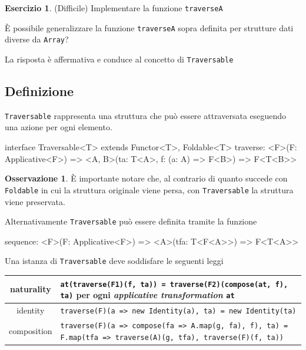 \documentclass[12pt]{article}
\theoremstyle{definition}
\newtheorem{exercise}{Esercizio}[section]
\newtheorem{observation}{Osservazione}[section]
\newenvironment{code}
  {\vspace{0.5cm} \VerbatimEnvironment\begin{typescriptcode}}
  {\end{typescriptcode} \vspace{0.2cm}}
\begin{document}
\begin{exercise}
(Difficile) Implementare la funzione \texttt{traverseA}
\end{exercise}

È possibile generalizzare la funzione \texttt{traverseA} sopra definita per strutture dati diverse da \texttt{Array}?

La risposta è affermativa e conduce al concetto di \texttt{Traversable}

\subsection{Definizione}

\texttt{Traversable} rappresenta una struttura che può essere attraversata eseguendo una azione per ogni elemento.

\begin{code}
interface Traversable<T> extends Functor<T>, Foldable<T> {
  traverse: <F>(F: Applicative<F>) =>
    <A, B>(ta: T<A>, f: (a: A) => F<B>) => F<T<B>>
}
\end{code}

\begin{observation}
È importante notare che, al contrario di quanto succede con \texttt{Foldable} in cui la struttura originale viene persa,
con \texttt{Traversable} la struttura viene preservata.
\end{observation}

Alternativamente \texttt{Traversable} può essere definita tramite la funzione

\begin{code}
sequence: <F>(F: Applicative<F>) => <A>(tfa: T<F<A>>) => F<T<A>>
\end{code}

Una istanza di \texttt{Traversable} deve soddisfare le seguenti leggi

\begin{center}
\bgroup
\def\arraystretch{1.5}
\begin{tabular}{ |c|p{10cm}| }
\hline
naturality & \texttt{at(traverse(F1)(f, ta)) = traverse(F2)(compose(at, f), ta)} per ogni \emph{applicative transformation} \texttt{at} \\
\hline
identity & \texttt{traverse(F)(a => new Identity(a), ta) = new Identity(ta)} \\
\hline
composition & \texttt{traverse(F)(a => compose(fa => A.map(g, fa), f), ta) = F.map(tfa => traverse(A)(g, tfa), traverse(F)(f, ta))} \\
\hline
\end{tabular}
\egroup
\end{center}
\end{document}
